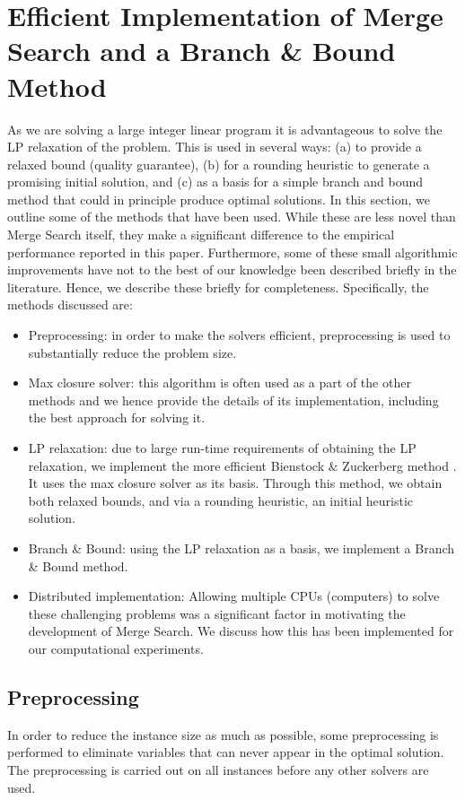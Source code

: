 \documentclass[authoryear,11pt,square,number,times,super,comma]{elsarticle}
\begin{document}
\section{Efficient Implementation of Merge Search and a Branch \& Bound Method} \label{sec:meth}
As we are solving a large integer linear program it is advantageous to solve the LP relaxation of the problem. This is used in several ways: (a) to provide a relaxed bound (quality guarantee), (b) for a rounding heuristic to generate a promising initial solution, and (c) as a basis for a simple branch and bound method that could in principle produce optimal solutions. 
In this section, we outline some of the methods that have been used. While these are less novel than Merge Search itself, they make a significant difference to the empirical performance reported in this paper. Furthermore, some of these small algorithmic improvements have not to the best of our knowledge been described briefly in the literature. Hence, we describe these briefly for completeness.  Specifically, the methods discussed are:
\begin{itemize}
\item Preprocessing: in order to make the solvers efficient, preprocessing is used to substantially reduce the problem size.
\item Max closure solver: this algorithm is often used as a part of the other methods and we hence provide the details of its implementation, including the best approach for solving it.   
\item LP relaxation: due to large run-time requirements of obtaining the LP relaxation, we implement the more efficient Bienstock $\&$ Zuckerberg method \citep{zuckerberg2010}. It uses the max closure solver as its basis. Through this method, we obtain both relaxed bounds, and via a rounding heuristic, an initial heuristic solution. 
\item Branch \& Bound: using the LP relaxation as a basis, we implement a Branch \& Bound method.
\item Distributed implementation: Allowing multiple CPUs (computers) to solve these challenging problems was a significant factor in motivating the development of Merge Search. We discuss how this has been implemented for our computational experiments.
\end{itemize}

\subsection{Preprocessing}\label{sec:preprocess}
In order to reduce the instance size as much as possible, some preprocessing is performed to eliminate variables that can never appear in the optimal solution. The preprocessing is carried out on all instances before any other solvers are used.
\end{document}
